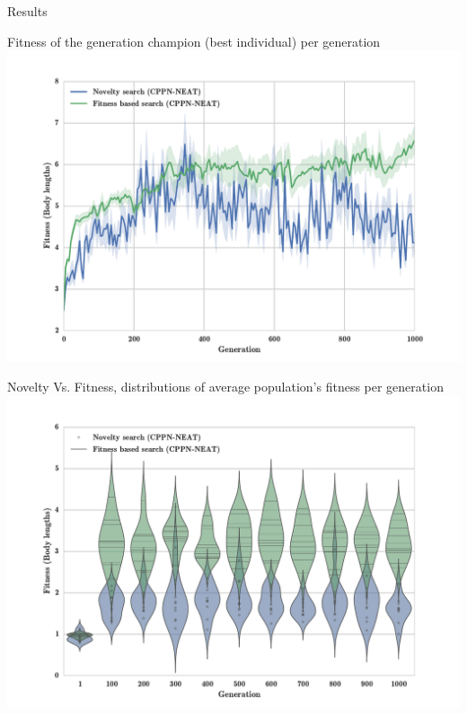 \documentclass{beamer}
\begin{document}
\begin{frame}[allowframebreaks]{Results}
\begin{minipage}{\textwidth}
\begin{block}{Fitness of the generation champion (best individual) per generation}
\includegraphics[width=1.0\textwidth]{../Figures/Results/AvgGenerChampNoveltyFitnessSize5.pdf}
\end{block}
\end{minipage}

\begin{minipage}{\textwidth}
\begin{block}{Novelty Vs. Fitness, distributions of average population's fitness per generation}
\includegraphics[width=1.0\textwidth]{../Figures/Results/ViolinPlotsAvgGenFitSize5.pdf}
\end{block}
\end{minipage}


\end{frame}
\end{document}
